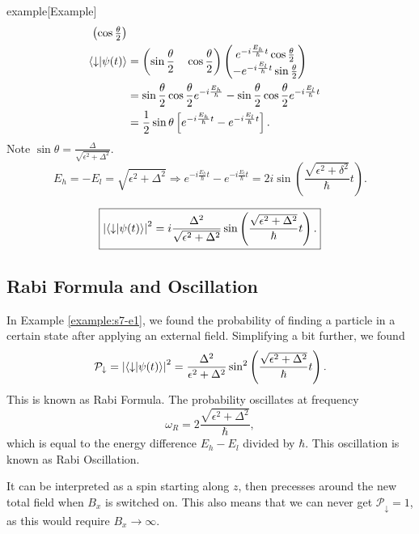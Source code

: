\documentclass{article}
\begin{document}
\begin{callout}{example}[Example]
\begin{align*}
\begin{pmatrix}
                         \cos \frac{\theta }{2}
                     \end{pmatrix} \\
    \braket{\downarrow }{\psi (t)} &= \left( \sin \frac{\theta }{2}\quad \cos \frac{\theta }{2} \right)\begin{pmatrix}
        e^{-i \frac{E_h}{\hbar}t}\cos \frac{\theta }{2}\\
        -e^{-i \frac{E_l}{\hbar}t} \sin \frac{\theta }{2} 
    \end{pmatrix} \\
                                   &= \sin \frac{\theta }{2} \cos \frac{\theta }{2} e^{-i \frac{E_h}{\hbar}}-\sin \frac{\theta }{2}\cos \frac{\theta }{2}e^{-i \frac{E_l}{\hbar}t} \\
                                   &= \frac{1}{2}\sin \theta \left[ e^{-i \frac{E_h}{\hbar}t}-e^{-i \frac{E_l}{\hbar}t} \right].
\end{align*}
Note $\sin \theta =\frac{\Delta }{\sqrt{\epsilon ^2+\Delta ^2}}$.
\[
    E_h=-E_l=\sqrt{\epsilon^2+\Delta^2}\Rightarrow e^{-i \frac{E_h}{\hbar}t}-e^{-i \frac{E_l}{\hbar}t}=2i \sin \left( \frac{\sqrt{\epsilon^2+\delta^2}}{\hbar}t \right).
\]

\[
    \boxed{\left| \braket{\downarrow}{\psi (t)} \right|^2=i\frac{\Delta^2}{\sqrt{\epsilon^2+\Delta^2}}\sin \left( \frac{\sqrt{\epsilon^2+\Delta^2}}{\hbar}t \right).}
\]
\end{callout}

\subsection{Rabi Formula and Oscillation}
In Example \ref{example:s7-e1}, we found the probability of finding a particle in a certain state after applying an external field. Simplifying a bit further, we found
\[
    \mathcal{P}_{\downarrow}=\left| \braket{\downarrow}{\psi (t)} \right|^2=\frac{\Delta^2}{\epsilon^2+\Delta^2}\sin^2 \left( \frac{\sqrt{\epsilon^2+\Delta^2}}{\hbar}t \right).
\]
This is known as Rabi Formula. The probability oscillates at frequency
\[
    \omega _R=2 \frac{\sqrt{\epsilon^2+\Delta^2}}{\hbar},
\]
which is equal to the energy difference $E_h-E_l$ divided by $\hbar$. This oscillation is known as Rabi Oscillation.

It can be interpreted as a spin starting along $z$, then precesses around the new total field when $B_x$ is switched on. This also means that we can never get $\mathcal{P}_{\downarrow}=1$, as this would require $B_x\to \infty$.
\end{document}
